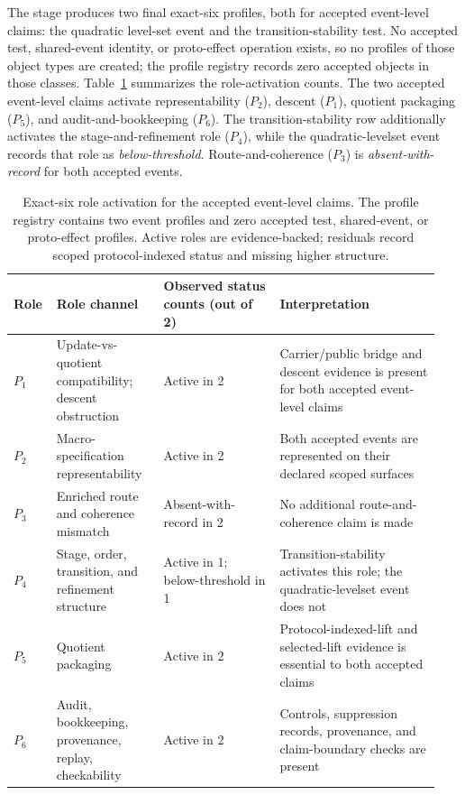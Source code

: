 \documentclass[11pt]{article}
\theoremstyle{definition}
\begin{document}
The stage produces two final exact-six profiles, both for accepted event-level claims: the quadratic level-set event and the transition-stability test. No accepted test, shared-event identity, or proto-effect operation exists, so no profiles of those object types are created; the profile registry records zero accepted objects in those classes. Table~\ref{tab:exact-six-role-activation} summarizes the role-activation counts. The two accepted event-level claims activate representability ($P_2$), descent ($P_1$), quotient packaging ($P_5$), and audit-and-bookkeeping ($P_6$). The transition-stability row additionally activates the stage-and-refinement role ($P_4$), while the quadratic-levelset event records that role as \emph{below-threshold}. Route-and-coherence ($P_3$) is \emph{absent-with-record} for both accepted events.

\begin{table}[t]
\centering
\small
\setlength{\tabcolsep}{4pt}
\begin{tabular}{p{0.08\linewidth}p{0.24\linewidth}p{0.26\linewidth}p{0.36\linewidth}}
\hline
\textbf{Role} & \textbf{Role channel} & \textbf{Observed status counts (out of 2)} & \textbf{Interpretation} \\
\hline
$P_1$
&
Update-vs-quotient compatibility; descent obstruction
&
Active in 2
&
Carrier/public bridge and descent evidence is present for both accepted event-level claims
\\[0.4em]
$P_2$
&
Macro-specification representability
&
Active in 2
&
Both accepted events are represented on their declared scoped surfaces
\\[0.4em]
$P_3$
&
Enriched route and coherence mismatch
&
Absent-with-record in 2
&
No additional route-and-coherence claim is made
\\[0.4em]
$P_4$
&
Stage, order, transition, and refinement structure
&
Active in 1; below-threshold in 1
&
Transition-stability activates this role; the quadratic-levelset event does not
\\[0.4em]
$P_5$
&
Quotient packaging
&
Active in 2
&
Protocol-indexed-lift and selected-lift evidence is essential to both accepted claims
\\[0.4em]
$P_6$
&
Audit, bookkeeping, provenance, replay, checkability
&
Active in 2
&
Controls, suppression records, provenance, and claim-boundary checks are present
\\
\hline
\end{tabular}
\caption{Exact-six role activation for the accepted event-level claims. The profile registry contains two event profiles and zero accepted test, shared-event, or proto-effect profiles. Active roles are evidence-backed; residuals record scoped protocol-indexed status and missing higher structure.}
\label{tab:exact-six-role-activation}
\end{table}
\end{document}
